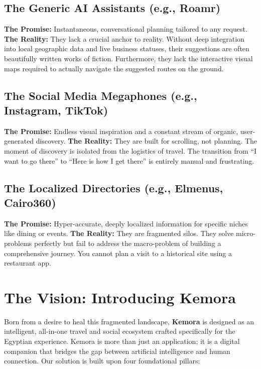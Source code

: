 \subsection{The Generic AI Assistants (e.g., Roamr)}
\textbf{The Promise:} Instantaneous, conversational planning tailored to any request.
\textbf{The Reality:} They lack a crucial anchor to reality. Without deep integration into local geographic data and live business statuses, their suggestions are often beautifully written works of fiction. Furthermore, they lack the interactive visual maps required to actually navigate the suggested routes on the ground.

\subsection{The Social Media Megaphones (e.g., Instagram, TikTok)}
\textbf{The Promise:} Endless visual inspiration and a constant stream of organic, user-generated discovery.
\textbf{The Reality:} They are built for scrolling, not planning. The moment of discovery is isolated from the logistics of travel. The transition from ``I want to go there'' to ``Here is how I get there'' is entirely manual and frustrating.

\subsection{The Localized Directories (e.g., Elmenus, Cairo360)}
\textbf{The Promise:} Hyper-accurate, deeply localized information for specific niches like dining or events.
\textbf{The Reality:} They are fragmented silos. They solve micro-problems perfectly but fail to address the macro-problem of building a comprehensive journey. You cannot plan a visit to a historical site using a restaurant app.

\section{The Vision: Introducing Kemora}
Born from a desire to heal this fragmented landscape, \textbf{Kemora} is designed as an intelligent, all-in-one travel and social ecosystem crafted specifically for the Egyptian experience. Kemora is more than just an application; it is a digital companion that bridges the gap between artificial intelligence and human connection. Our solution is built upon four foundational pillars:

